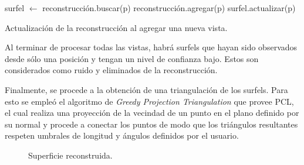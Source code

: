 	\begin{algorithm}
		\begin{algorithmic}[1]
					\State surfel $\gets$ reconstrucción.buscar(p)
						\State reconstrucción.agregar(p)
					\Else
						\State surfel.actualizar(p)
					\EndIf
				\EndFor
			\EndFunction
		\end{algorithmic}
		\caption{\label{alg:surfel}Actualización de la reconstrucción al agregar una nueva vista.}
	\end{algorithm}

	Al terminar de procesar todas las vistas, habrá surfels que hayan sido
	observados desde sólo una posición y tengan un nivel de confianza bajo.
	Estos son considerados como ruido y eliminados de la
	reconstrucción.

	Finalmente, se procede a la obtención de una triangulación de los surfels.
	Para esto se empleó el algoritmo de \emph{Greedy Projection Triangulation} que provee PCL,
	el cual realiza una proyección de la vecindad de un punto en el plano definido por su normal
	y procede a conectar los puntos de modo que los triángulos resultantes
	respeten umbrales de longitud y ángulos definidos por el usuario.

	\begin{figure}
		\caption{\label{fig:surface}Superficie reconstruida.}
	\end{figure}
